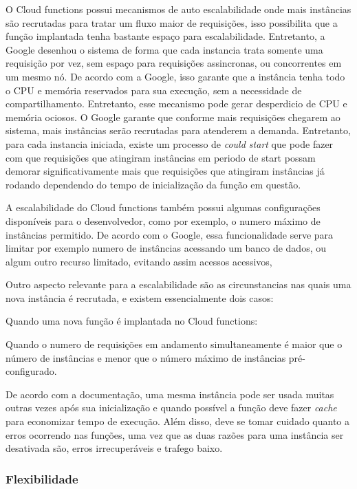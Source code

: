 O Cloud functions possui mecanismos de auto escalabilidade onde mais instâncias são recrutadas para tratar um fluxo maior de requisições, isso possibilita que a função implantada tenha bastante espaço para escalabilidade. Entretanto, a Google desenhou o sistema de forma que cada instancia trata somente uma requisição por vez, sem espaço para requisições assincronas, ou concorrentes em um mesmo nó. De acordo com a Google, isso garante que a instância tenha todo o CPU e memória reservados para sua execução, sem a necessidade de compartilhamento. Entretanto, esse mecanismo pode gerar desperdicio de CPU e memória ociosos. O Google garante que conforme mais requisições chegarem ao sistema, mais instâncias serão recrutadas para atenderem a demanda. Entretanto, para cada instancia iniciada, existe um processo de \textit{could start} que pode fazer com que requisições que atingiram instâncias em periodo de start possam demorar significativamente mais que requisições que atingiram instâncias já rodando dependendo do tempo de inicialização da função em questão.

\bigskip
A escalabilidade do Cloud functions também possui algumas configurações disponíveis para o desenvolvedor, como por exemplo, o numero máximo de instâncias permitido. De acordo com o Google, essa funcionalidade serve para limitar por exemplo numero de instâncias acessando um banco de dados, ou algum outro recurso limitado, evitando assim acessos acessivos, 

\bigskip
Outro aspecto relevante para a escalabilidade são as circunstancias nas quais uma nova instância é recrutada, e existem essencialmente dois casos:
\begin{alineas}
	\item Quando uma nova função é implantada no Cloud functions:
	\item Quando o numero de requisições em andamento simultaneamente é maior que o número de instâncias e menor que o número máximo de instâncias pré-configurado.
\end{alineas}

\bigskip
De acordo com a documentação, uma mesma instância pode ser usada muitas outras vezes após sua inicialização e quando possível a função deve fazer \textit{cache} para economizar tempo de execução. Além disso, deve se tomar cuidado quanto a erros ocorrendo nas funções, uma vez que as duas razões para uma instância ser desativada são, erros irrecuperáveis e trafego baixo.

\subsubsection{Flexibilidade}

